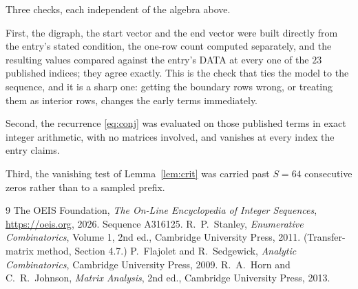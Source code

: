 \documentclass[11pt,a4paper]{article}
\theoremstyle{plain}
\theoremstyle{definition}
\begin{document}
Three checks, each independent of the algebra above.

First, the digraph, the start vector and the end vector were built directly from the
entry's stated condition, the one-row count computed separately, and the resulting values
compared against the entry's DATA at every one of the $23$ published indices; they
agree exactly. This is the check that ties the model to the sequence, and it is a sharp one:
getting the boundary rows wrong, or treating them as interior rows, changes the early terms
immediately.

Second, the recurrence \eqref{eq:conj} was evaluated on those published terms in exact
integer arithmetic, with no matrices involved, and vanishes at every index the entry claims.

Third, the vanishing test of Lemma~\ref{lem:crit} was carried past $S=64$ consecutive
zeros rather than to a sampled prefix.

\begin{thebibliography}{9}
 The OEIS Foundation, \emph{The On-Line Encyclopedia of Integer
Sequences}, \url{https://oeis.org}, 2026. Sequence A316125.
 R.~P.~Stanley, \emph{Enumerative Combinatorics}, Volume 1, 2nd ed.,
Cambridge University Press, 2011. (Transfer-matrix method, Section 4.7.)
 P.~Flajolet and R.~Sedgewick, \emph{Analytic Combinatorics}, Cambridge
University Press, 2009.
 R.~A.~Horn and C.~R.~Johnson, \emph{Matrix Analysis}, 2nd ed., Cambridge
University Press, 2013.
\end{thebibliography}
\end{document}
